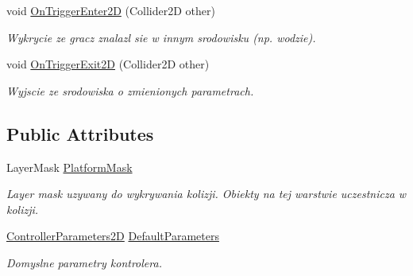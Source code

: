 \begin{DoxyCompactItemize}
void \hyperlink{class_character_controller2_d_a9ac0f6a16c9a0e7190e5645a9ba77667}{On\+Trigger\+Enter2\+D} (Collider2\+D other)
\begin{DoxyCompactList}\small\item\em Wykrycie ze gracz znalazl sie w innym srodowisku (np. wodzie). \end{DoxyCompactList}\item 
void \hyperlink{class_character_controller2_d_a91e2f7eefc4b8e8590f8eca161d9a655}{On\+Trigger\+Exit2\+D} (Collider2\+D other)
\begin{DoxyCompactList}\small\item\em Wyjscie ze srodowiska o zmienionych parametrach. \end{DoxyCompactList}\end{DoxyCompactItemize}
\subsection*{Public Attributes}
\begin{DoxyCompactItemize}
\item 
Layer\+Mask \hyperlink{class_character_controller2_d_a239fc145e05e239c584bf7b1783b590e}{Platform\+Mask}
\begin{DoxyCompactList}\small\item\em Layer mask uzywany do wykrywania kolizji. Obiekty na tej warstwie uczestnicza w kolizji. \end{DoxyCompactList}\item 
\hyperlink{class_controller_parameters2_d}{Controller\+Parameters2\+D} \hyperlink{class_character_controller2_d_a33b6d08469389f16262f8a179ec3c873}{Default\+Parameters}
\begin{DoxyCompactList}\small\item\em Domyslne parametry kontrolera. \end{DoxyCompactList}\end{DoxyCompactItemize}
